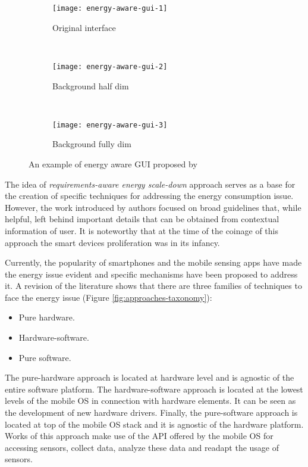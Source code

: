 \begin{figure}
        \centering
        \begin{subfigure}[b]{0.3\textwidth}
                \texttt{[image: energy-aware-gui-1]}
                \caption{Original interface}
                \label{fig:energy-aware-gui-1}
        \end{subfigure}
        ~
        \begin{subfigure}[b]{0.3\textwidth}
                \texttt{[image: energy-aware-gui-2]}
                \caption{Background half dim}
                \label{fig:energy-aware-gui-2}
        \end{subfigure}
        ~
        \begin{subfigure}[b]{0.3\textwidth}
                \texttt{[image: energy-aware-gui-3]}
                \caption{Background fully dim}
                \label{fig:energy-aware-gui-3}
        \end{subfigure}
        \caption[An example of energy aware GUI by \protect\cite{Mayo2004}]{An example of energy aware GUI proposed by \protect\cite{Mayo2004}}
        \label{fig-scaling-down-screen-usage}
\end{figure}

The idea of \emph{requirements-aware energy scale-down} approach serves as a base for the creation of specific techniques for addressing the energy consumption issue.
However, the work introduced by authors focused on broad guidelines that, while helpful, left behind important details that can be obtained from contextual information of user.
It is noteworthy that at the time of the coinage of this approach the smart devices proliferation was in its infancy.

Currently, the popularity of smartphones and the mobile sensing apps have made the energy issue evident and specific mechanisms have been proposed to address it.
A revision of the literature shows that there are three families of techniques to face the energy issue (Figure \ref{fig:approaches-taxonomy}): 

\begin{itemize}
  \item Pure hardware.
  \item Hardware-software.
  \item Pure software.
\end{itemize}

The pure-hardware approach is located at hardware level and is agnostic of the entire software platform.
The hardware-software approach is located at the lowest levels of the mobile OS in connection with hardware elements.
It can be seen as the development of new hardware drivers.
Finally, the pure-software approach is located at top of the mobile OS stack and it is agnostic of the hardware platform.
Works of this approach make use of the API offered by the mobile OS for accessing sensors, collect data, analyze these data and readapt the usage of sensors.


